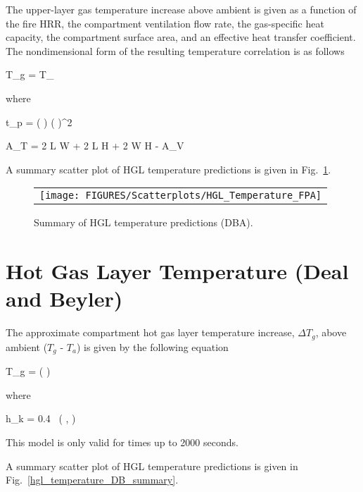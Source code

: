 The upper-layer gas temperature increase above ambient is given as a function of the fire HRR, the compartment ventilation flow rate, the gas-specific heat capacity, the compartment surface area, and an effective heat transfer coefficient. The nondimensional form of the resulting temperature correlation is as follows

\be
\Delta T_g =  T_\infty
\ee

\noindent where

\be
t_p = \left(  \right) \left(  \right)^2
\ee

\be
A_T = 2 L W + 2 L H + 2 W H - A_V
\ee

\clearpage

A summary scatter plot of HGL temperature predictions is given in Fig.~\ref{hgl_temperature_FPA_summary}. 

\begin{figure}[ht]
\begin{center}
\begin{tabular}{l}
\texttt{[image: FIGURES/Scatterplots/HGL\_Temperature\_FPA]}
\end{tabular}
\end{center}
\caption[Summary of HGL temperature predictions (DBA).]
{Summary of HGL temperature predictions (DBA).}
\label{hgl_temperature_FPA_summary}
\end{figure}


\clearpage


\section{Hot Gas Layer Temperature (Deal and Beyler)}

The approximate compartment hot gas layer temperature increase, $\Delta T_g$, above ambient ($T_g$ - $T_a$) is given by the following equation

\be
\Delta T_g = \left(  \right)
\ee

\noindent where

\be
h_k = 0.4\  \left(  ,  \right)
\ee

\noindent This model is only valid for times up to 2000 seconds.

\clearpage

A summary scatter plot of HGL temperature predictions is given in Fig.~\ref{hgl_temperature_DB_summary}.

